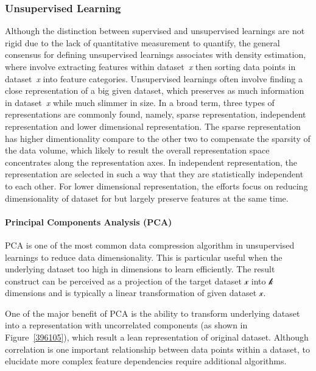 \subsubsection{Unsupervised Learning}
Although the distinction between supervised and unsupervised learnings are not rigid due to the lack of quantitative measurement to quantify, the general consensus for defining unsupervised learnings associates with density estimation, where involve extracting features within dataset~\textit{x} then sorting data points in dataset~\textit{x} into feature categories.
Unsupervised learnings often involve finding a close representation of a big given  dataset, which preserves as much information in dataset~\textit{x} while much slimmer in size. In a broad term, three types of representations are commonly found, namely, sparse representation, independent representation and lower dimensional representation. The sparse representation~\cite{Barlow_1989,Olshausen_1996,Hinton_1997} has higher dimentionality compare to the other two to compensate the sparsity of the data volume, which likely to result the overall representation space concentrates along the representation axes. In independent representation, the representation are selected in such a way that they are statistically independent to each other. For lower dimensional representation, the efforts focus on reducing dimensionality of dataset for but largely preserve features at the same time. 

\paragraph{Principal Components Analysis (PCA)}
PCA is one of the most common data compression algorithm in unsupervised learnings to reduce data dimensionality. This is particular useful when the underlying dataset too high in dimensions to learn efficiently. The result construct can be perceived as a projection of the target dataset $\mathcal{x}$ into $\mathcal{k}$ dimensions and is typically a linear transformation of given dataset $\mathcal{x}$.
\par 
One of the major benefit of PCA is the ability to transform underlying dataset into a representation with uncorrelated components (as shown in Figure~\ref{396105}), which result a lean representation of original dataset. Although correlation is one important relationship between data points within a dataset, to elucidate more complex feature dependencies require additional algorithms. 

